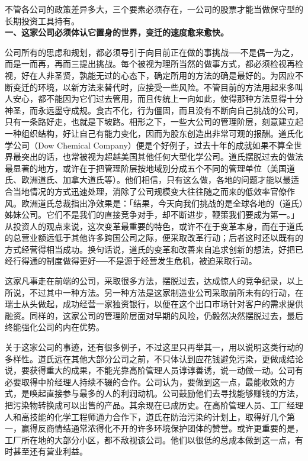 \documentclass[UTF8,a4paper,zihao=-4,fontset = windows]{ctexart} %
\begin{document}
不管各公司的政策差异多大，三个要素必须存在，一公司的股票才能当做保守型的长期投资工具持有。
\\

\textbf{一、这家公司必须体认它置身的世界，变迁的速度愈来愈快。}


公司所有的思虑和规划，都必须导引于向目前正在做的事挑战──不是偶一为之，而是一而再，再而三提出挑战。每个被视为理所当然的做事方式，都必须检视再检视，好在人非圣贤，孰能无过的心态下，确定所用的方法的确是最好的。为因应不断变迁的环境，以新方法来替代时，应接受一些风险。不管目前的方法用起来多叫人安心，都不能因为它们过去管用，而且传统上一向如此，使得那种方法显得十分神圣，而永远墨守成规。食古不化，行为僵固，而且没有不断向自己挑战的公司，只有一条路好走，也就是下坡路。相形之下，一些大公司的管理阶层，刻意建立起一种组织结构，好让自己有能力变化，因而为股东创造出非常可观的报酬。道氏化学公司（Dow Chemical Company）便是个好例子，过去十年的成就如果不算全世界最突出的话，也常被视为超越美国其他任何大型化学公司。道氏摆脱过去的做法最显著的地方，或许在于把管理阶层按地域别分成五个不同的管理单位（美国道氏、欧洲道氏、加拿大道氏等）。他们相信，只有这么做，各地的问题才能以最适合当地情况的方式迅速处理，消除了公司规模变大往往随之而来的低效率官僚作风。欧洲道氏总裁指出净效果是：「结果，今天向我们挑战的是全球各地的（道氏）姊妹公司。它们不是我们的直接竞争对手，却不断进步，鞭策我们要成为第一。」从投资人的观点来说，这次变革最重要的特色，或许不在于变革本身，而在于道氏的总营业额远低于其他许多跨国公司之际，便采取改革行动；后者这时还以既有的方式经营得相当成功。换句话说，道氏的变革和改善来自追求创新的想法，好把已经行得通的制度做得更好──不是源于经营发生危机，被迫采取行动。

这家凡事走在前端的公司，采取很多方法，摆脱过去，达成惊人的竞争纪录，以上所说，不过其中一种方法。另一种方法是这家制造业公司采取前所未有的行动，在瑞士从头做起，成功经营一家独资银行，以便在这个出口市场针对客户的需求提供融资。同样的，这家公司的管理阶层面对早期的风险，仍毅然决然摆脱过去，最后终能强化公司的内在优势。

关于这家公司的事迹，还有很多例子，不过这里只再举其一，用以说明这类行动的多样性。道氏远在其他大部分公司之前，不只体认到应花钱避免污染，更做成结论说，要获得重大的成果，不能光靠高阶管理人员谆谆善诱，说一动做一动。公司有必要取得中阶经理人持续不辍的合作。公司认为，要做到这一点，最能收效的方式，是唤起直接参与最多的人的利润动机。公司鼓励他们去寻找能够赚钱的方法，把污染物转换成可以出售的产品。其余现在已成历史。在高阶管理人员、工厂经理人和高技能的化学工程师通力合作下，道氏在防治污染的计划上，取得好几个第一，赢得反商情结通常浓得化不开的许多环境保护团体的赞誉。或许更重要的是，工厂所在地的大部分小区，都不敌视该公司。他们以很低的总成本做到这一点，有时甚至还有营业利益。
\\
\end{document}
